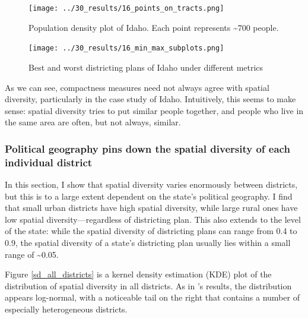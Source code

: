 \documentclass[]{article}
\begin{document}
\begin{figure}
\centering
\texttt{[image: ../30\_results/16\_points\_on\_tracts.png]}
\caption{Population density plot of Idaho. Each point represents
\textasciitilde{}700 people. \label{idaho_density}}
\end{figure}

\begin{figure}
\centering
\texttt{[image: ../30\_results/16\_min\_max\_subplots.png]}
\caption{Best and worst districting plans of Idaho under different
metrics \label{idaho_minmax}}
\end{figure}

As we can see, compactness measures need not always agree with spatial
diversity, particularly in the case study of Idaho. Intuitively, this
seems to make sense: spatial diversity tries to put similar people
together, and people who live in the same area are often, but not
always, similar.

\hypertarget{political-geography-pins-down-the-spatial-diversity-of-each-individual-district}{%
\subsubsection{Political geography pins down the spatial diversity of
each individual
district}\label{political-geography-pins-down-the-spatial-diversity-of-each-individual-district}}

In this section, I show that spatial diversity varies enormously between
districts, but this is to a large extent dependent on the state's
political geography. I find that small urban districts have high spatial
diversity, while large rural ones have low spatial
diversity---regardless of districting plan. This also extends to the
level of the state: while the spatial diversity of districting plans can
range from 0.4 to 0.9, the spatial diversity of a state's districting
plan usually lies within a small range of \textasciitilde{}0.05.

Figure \ref{sd_all_districts} is a kernel density estimation (KDE) plot
of the distribution of spatial diversity in all districts. As in
\citeauthor{steph2012}'s results, the distribution appears log-normal,
with a noticeable tail on the right that contains a number of especially
heterogeneous districts.
\end{document}

